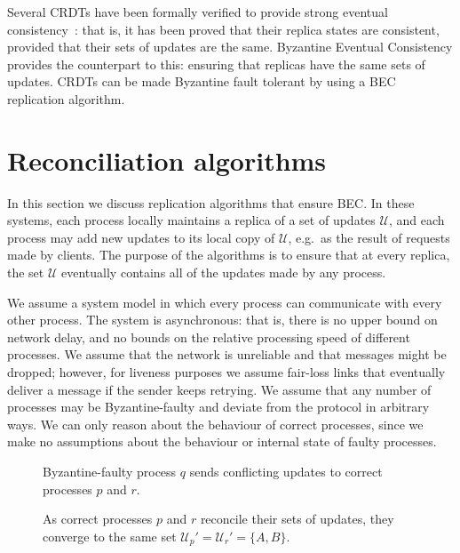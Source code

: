 \documentclass[a4paper,anonymous,USenglish]{lipics-v2019}
\begin{document}
Several CRDTs have been formally verified to provide strong eventual consistency~\cite{Gomes:2017gy,Zeller:2014fl}: that is, it has been proved that their replica states are consistent, provided that their sets of updates are the same.
Byzantine Eventual Consistency provides the counterpart to this: ensuring that replicas have the same sets of updates.
CRDTs can be made Byzantine fault tolerant by using a BEC replication algorithm.

\section{Reconciliation algorithms}\label{sec:algorithm}

In this section we discuss replication algorithms that ensure BEC.
In these systems, each process locally maintains a replica of a set of updates $\mathcal{U}$, and each process may add new updates to its local copy of $\mathcal{U}$, e.g.\ as the result of requests made by clients.
The purpose of the algorithms is to ensure that at every replica, the set $\mathcal{U}$ eventually contains all of the updates made by any process.

We assume a system model in which every process can communicate with every other process.
The system is asynchronous: that is, there is no upper bound on network delay, and no bounds on the relative processing speed of different processes.
We assume that the network is unreliable and that messages might be dropped; however, for liveness purposes we assume fair-loss links that eventually deliver a message if the sender keeps retrying.
We assume that any number of processes may be Byzantine-faulty and deviate from the protocol in arbitrary ways.
We can only reason about the behaviour of correct processes, since we make no assumptions about the behaviour or internal state of faulty processes.

\begin{figure}
    \centering
    
    \caption{Byzantine-faulty process $q$ sends conflicting updates to correct processes $p$ and $r$.}
    \label{fig:trivial1}
\end{figure}

\begin{figure}
    \centering
    
    \caption{As correct processes $p$ and $r$ reconcile their sets of updates, they converge to the same set $\mathcal{U}_p' = \mathcal{U}_r' = \{A,B\}$.}
    \label{fig:trivial2}
\end{figure}
\end{document}

